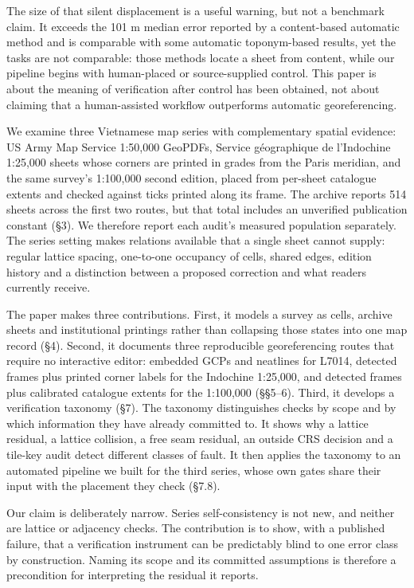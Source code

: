 \documentclass[11pt,a4paper]{article}
\begin{document}
The size of that silent displacement is a useful warning, but not a benchmark claim. It exceeds the 101 m median error reported by a content-based automatic method and is comparable with some automatic toponym-based results, yet the tasks are not comparable: those methods locate a sheet from content, while our pipeline begins with human-placed or source-supplied control. This paper is about the meaning of verification after control has been obtained, not about claiming that a human-assisted workflow outperforms automatic georeferencing.

We examine three Vietnamese map series with complementary spatial evidence: US Army Map Service 1:50,000 GeoPDFs, Service géographique de l'Indochine 1:25,000 sheets whose corners are printed in grades from the Paris meridian, and the same survey's 1:100,000 second edition, placed from per-sheet catalogue extents and checked against ticks printed along its frame. The archive reports 514 sheets across the first two routes, but that total includes an unverified publication constant (§3). We therefore report each audit's measured population separately. The series setting makes relations available that a single sheet cannot supply: regular lattice spacing, one-to-one occupancy of cells, shared edges, edition history and a distinction between a proposed correction and what readers currently receive.

The paper makes three contributions. First, it models a survey as cells, archive sheets and institutional printings rather than collapsing those states into one map record (§4). Second, it documents three reproducible georeferencing routes that require no interactive editor: embedded GCPs and neatlines for L7014, detected frames plus printed corner labels for the Indochine 1:25,000, and detected frames plus calibrated catalogue extents for the 1:100,000 (§§5–6). Third, it develops a verification taxonomy (§7). The taxonomy distinguishes checks by scope and by which information they have already committed to. It shows why a lattice residual, a lattice collision, a free seam residual, an outside CRS decision and a tile-key audit detect different classes of fault. It then applies the taxonomy to an automated pipeline we built for the third series, whose own gates share their input with the placement they check (§7.8).

Our claim is deliberately narrow. Series self-consistency is not new, and neither are lattice or adjacency checks. The contribution is to show, with a published failure, that a verification instrument can be predictably blind to one error class by construction. Naming its scope and its committed assumptions is therefore a precondition for interpreting the residual it reports.
\end{document}
